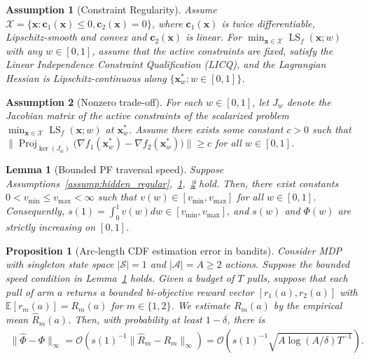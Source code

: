 \documentclass[10pt,a4paper]{amsart}
\newtheorem{assumption}{Assumption}
\newtheorem{lemma}{Lemma}
\newtheorem{proposition}{Proposition}
\newcommand{\E}{\mathbb{E}}
\newcommand{\Farc}{\Phi}
\newcommand{\LS}{\operatorname{LS}}
\newcommand{\Oc}{\mathcal{O}}
\newcommand{\Proj}{\operatorname{Proj}}
\newcommand{\X}{\mathcal{X}}
\newcommand{\bx}{\mathbf{x}}
\newcommand{\hatFarc}{\hat{\Phi}}
\begin{document}
\begin{assumption}[Constraint Regularity]
\label{assump:LICQ}
Assume $\X=\{\bx:\mathbf c_1(\bx)\le 0,\mathbf c_2(\bx)= 0\}$, where $\mathbf c_1(\bx)$ is twice differentiable, Lipschitz-smooth and convex and $\mathbf c_2(\bx)$ is linear. For $\min_{\bx\in\X}\LS_f(\bx;w)$ with any $w\in[0,1]$, assume that the active constraints are fixed, satisfy the Linear Independence Constraint Qualification (LICQ), and the Lagrangian Hessian is Lipschitz-continuous along $\{\bx_w^*:w\in[0,1]\}$.
\end{assumption}

\begin{assumption}[Nonzero trade-off]
\label{assump:tangent_gap}
For each $w\in[0,1]$, let $J_w$ denote the Jacobian matrix of the active constraints of the scalarized problem $\min_{\bx\in\X}\LS_f(\bx;w)$ at $\bx_w^*$. Assume there exists some constant $c>0$ such that $\big\| \Proj_{\ker(J_w)}\big(\nabla f_1(\bx_w^*)-\nabla f_2(\bx_w^*)\big)\big\|\ge c$ for all $w\in[0,1]$.
\end{assumption}

\begin{lemma}[Bounded PF traversal speed]
\label{lem:v_bound_from_tangent_gap}
Suppose Assumptions~\ref{assump:hidden_regular},~\ref{assump:LICQ},~\ref{assump:tangent_gap} hold. Then, there exist constants $0<v_{\min}\le v_{\max}<\infty$ such that $v(w)\in [v_{\min},v_{\max}]$ for all $w\in[0,1]$. Consequently, $s(1)=\int_0^1 v(w) dw\in [v_{\min},v_{\max}]$, and $s(w)$ and $\Farc(w)$ are strictly increasing on $[0,1]$.
\end{lemma}

\begin{proposition}[Arc-length CDF estimation error in bandits]
\label{prop:bandit_R_and_Farc_err}
Consider MDP with singleton state space $|\mathcal{S}|=1$ and $|\mathcal{A}|=A\ge 2$ actions. Suppose the bounded speed condition in Lemma~\ref{lem:v_bound_from_tangent_gap} holds.
Given a budget of $T$ pulls, suppose that each pull of arm $a$ returns a bounded bi-objective reward vector
$[r_1(a),r_2(a)]$ with $\E[r_m(a)]=R_m(a)$ for $m\in\{1,2\}$.
We estimate $R_m(a)$ by the empirical mean $\hat R_m(a)$.
Then, with probability at least $1-\delta$, there is
\begin{align}
\|\hatFarc-\Farc\|_\infty
 = \Oc\left(s(1)^{-1}\|\hat R_m-R_m\|_\infty \right) = 
\Oc \left(s(1)^{-1}\sqrt{A\log(A/\delta)T^{-1}}\right).
\end{align}
\end{proposition}
\end{document}
